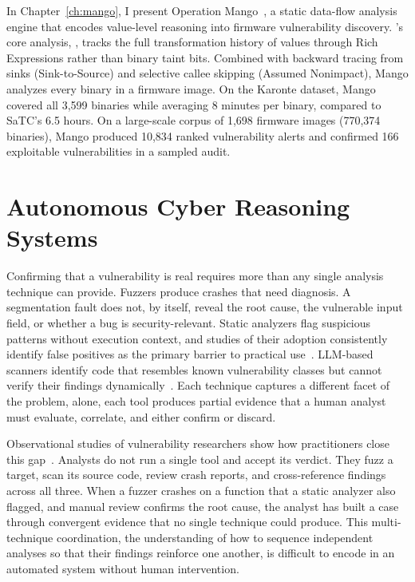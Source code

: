 In Chapter~\ref{ch:mango}, I present Operation Mango~\cite{gibbs2024mango}, a static data-flow analysis engine that encodes value-level reasoning into
firmware vulnerability discovery.
\mango's core analysis, \rda, tracks the full transformation history of values through Rich Expressions rather than binary taint bits.
Combined with backward tracing from sinks (Sink-to-Source) and selective callee skipping (Assumed Nonimpact), Mango analyzes every binary in a firmware image.
On the Karonte dataset, Mango covered all 3,599 binaries while averaging 8 minutes per binary, compared to SaTC's 6.5 hours.
On a large-scale corpus of 1,698 firmware images (770,374 binaries), Mango produced 10,834 ranked vulnerability alerts and confirmed 166 exploitable
vulnerabilities in a sampled audit.


\section{Autonomous Cyber Reasoning Systems}

Confirming that a vulnerability is real requires more than any single analysis technique can provide.
Fuzzers produce crashes that need diagnosis.
A segmentation fault does not, by itself, reveal the root cause, the vulnerable input field, or whether
a bug is security-relevant.
Static analyzers flag suspicious patterns without execution context, and studies of their adoption consistently identify false positives as the primary
barrier to practical use~\cite{johnson2013staticanalysis}.
LLM-based scanners identify code that resembles known vulnerability classes but cannot verify their findings dynamically~\cite{thapa2022vuldeepecker}.
Each technique captures a different facet of the problem, alone, each tool produces partial evidence that a human analyst must evaluate, correlate, and
either confirm or discard.

Observational studies of vulnerability researchers show how practitioners close this gap~\cite{votipka2019observational}.
Analysts do not run a single tool and accept its verdict.
They fuzz a target, scan its source code, review crash reports, and cross-reference findings across all three.
When a fuzzer crashes on a function that a static analyzer also flagged, and manual review confirms the root cause, the analyst has built a case through
convergent evidence that no single technique could produce.
This multi-technique coordination, the understanding of how to sequence independent analyses so that their findings reinforce one another, is
difficult to encode in an automated system without human intervention.

